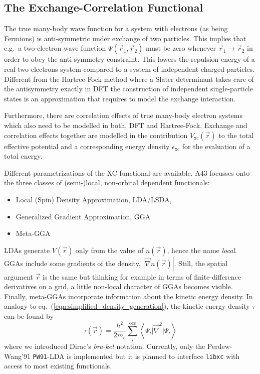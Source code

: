 \documentclass[oribibl]{llncs}
\newcommand{\um}[1]{_{\mathrm{#1}}}
\newcommand{\ttt}[1]{\texttt{#1}}
\newcommand{\braketop}[3]{\left\langle \left. #1 \right| #2 \left| #3 \right. \right\rangle}
\newcommand{\codename}{A43}
\begin{document}
\subsection{The Exchange-Correlation Functional} \label{sec:xc-functional}
%
The true many-body wave function for a system with electrons (as being Fermions)
is anti-symmetric under exchange of two particles. 
This implies that e.g.~a two-electron wave function $\Psi(\vec r_1,\vec r_2)$ must be zero 
whenever $\vec r_1 \rightarrow \vec r_2$ in order to obey the anti-symmetry constraint.
This lowers the repulsion energy of a real two-electrons system compared to a
system of independent charged particles.
Different from the Hartree-Fock method where a Slater determinant takes care of the antisymmetry exactly
in \ac{DFT} the construction of independent single-particle states 
is an approximation that requires to model the exchange interaction.

Furthermore, there are correlation effects of true many-body electron systems
which also need to be modelled in both, \ac{DFT} and Hartree-Fock.
Exchange and correlation effects together are modelled in the contribution $V\um{xc}(\vec r)$ 
to the total effective potential and a corresponding energy density $\epsilon\um{xc}$ for the evaluation of a total energy.

Different parametrizations of the \ac{XC} functional are available.
\codename{} focusses onto the three classes of (semi-)local, non-orbital dependent functionals: 
\begin{itemize}
	\item Local (Spin) Density Approximation, LDA/LSDA, 
	\item Generalized Gradient Approximation, GGA
	\item Meta-GGA
\end{itemize}
LDAs generate $V(\vec r)$ only from the value of $n(\vec r)$, 
hence the name \emph{local}. 
GGAs include some gradients of the density, $|\vec \nabla n(\vec r)|$.
Still, the spatial argument $\vec r$ is the same but thinking for example
in terms of finite-difference derivatives on a grid, 
a little non-local character of GGAs becomes visible.
Finally, meta-GGAs incorporate information about the kinetic energy density.
In analogy to eq.~(\ref{eqn:simplified_density_generation}), the kinetic energy density $\tau$ can be found by
\begin{equation}
	\tau(\vec r) = \frac{\hbar^2}{2m_e} \sum_i^{\mathrm{occ}} \braketop{ \Psi_i } {\vec \nabla^2 } { \Psi_i } 
	\label{eqn:simplified_kinetic_energy_density_generation}
\end{equation}
where we introduced Dirac's \emph{bra-ket} notation.
Currently, only the 
Perdew-Wang'91 \ttt{PW91}-LDA is implemented
but it is planned to interface \ttt{libxc} with access to most existing functionals.
\end{document}
